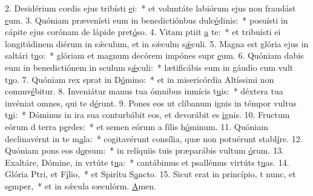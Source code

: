 2. Desidérium cordis ejus tribísti \uline{e}i:~* et voluntáte labiórum ejus non fraudást \uline{e}um.
3. Quóniam prævenísti eum in benedictiónbus dulc\uline{é}dinis:~* posuísti in cápite ejus corónam de lápide pret\uline{ó}so.
4. Vitam ptiit \uline{a} te:~* et tribuísti ei longitúdinem diérum in sǽculum, et in sǽculm s\uline{ǽ}culi.
5. Magna est glória ejus in saltári t\uline{u}o:~* glóriam et magnum decórem impónes supr \uline{e}um.
6. Quóniam dabis eum in benedictiónem in sculum s\uline{ǽ}culi:~* lætificábis eum in gáudio cum vult t\uline{u}o.
7. Quóniam rex sprat in D\uline{ó}mino:~* et in misericórdia Altíssimi non commv\uline{é}bitur.
8. Inveniátur manus tua ómnibus inmícis t\uline{u}is:~* déxtera tua invéniat omnes, qui te d\uline{é}runt.
9. Pones eos ut clíbanum ignis in témpor vultus t\uline{u}i:~* Dóminus in ira sua conturbábit eos, et devorábit es \uline{i}gnis.
10. Fructum eórum d terra p\uline{e}rdes:~* et semen eórum a fílis h\uline{ó}minum.
11. Quóniam declinavérnt in te m\uline{a}la:~* cogitavérunt consília, quæ non potuérunt stabl\uline{í}re.
12. Quóniam pons eos d\uline{o}rsum:~* in relíquiis tuis præparábis vultum \uline{ó}rum.
13. Exaltáre, Dómine, in vrtúte t\uline{u}a:~* cantábimus et psallémus virtúts t\uline{u}as.
14. Glória Ptri, et F\uline{í}lio,~* et Spirítu S\uline{a}ncto.
15. Sicut erat in princípio, t nunc, et s\uline{e}mper,~* et in sǽcula sæculórm. \uline{A}men.
